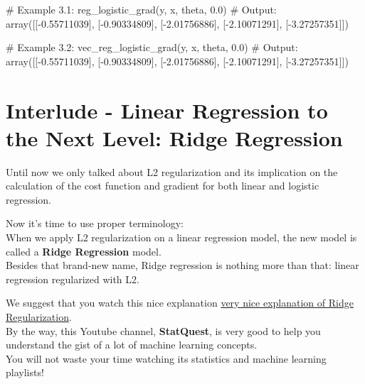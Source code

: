\documentclass[]{article}
\newenvironment{Shaded}{\begin{snugshade}}{\end{snugshade}}
\newcommand{\CommentTok}[1]{\textcolor[rgb]{0.48,0.49,0.49}{#1}}
\newcommand{\FloatTok}[1]{\textcolor[rgb]{0.96,0.45,0.00}{#1}}
\newcommand{\NormalTok}[1]{\textcolor[rgb]{0.81,0.81,0.76}{#1}}
\newcommand{\OperatorTok}[1]{\textcolor[rgb]{0.81,0.81,0.76}{#1}}
\begin{document}
\begin{Shaded}
\begin{Highlighting}[]
\CommentTok{# Example 3.1:}
\NormalTok{reg_logistic_grad(y, x, theta, }\FloatTok{0.0}\NormalTok{)}
\CommentTok{# Output:}
\NormalTok{array([[}\OperatorTok{-}\FloatTok{0.55711039}\NormalTok{],}
\NormalTok{       [}\OperatorTok{-}\FloatTok{0.90334809}\NormalTok{],}
\NormalTok{       [}\OperatorTok{-}\FloatTok{2.01756886}\NormalTok{],}
\NormalTok{       [}\OperatorTok{-}\FloatTok{2.10071291}\NormalTok{],}
\NormalTok{       [}\OperatorTok{-}\FloatTok{3.27257351}\NormalTok{]])}

\CommentTok{# Example 3.2:}
\NormalTok{vec_reg_logistic_grad(y, x, theta, }\FloatTok{0.0}\NormalTok{)}
\CommentTok{# Output:}
\NormalTok{array([[}\OperatorTok{-}\FloatTok{0.55711039}\NormalTok{],}
\NormalTok{       [}\OperatorTok{-}\FloatTok{0.90334809}\NormalTok{],}
\NormalTok{       [}\OperatorTok{-}\FloatTok{2.01756886}\NormalTok{],}
\NormalTok{       [}\OperatorTok{-}\FloatTok{2.10071291}\NormalTok{],}
\NormalTok{       [}\OperatorTok{-}\FloatTok{3.27257351}\NormalTok{]])}
\end{Highlighting}
\end{Shaded}

\clearpage

\hypertarget{interlude---linear-regression-to-the-next-level-ridge-regression-1}{%
\section{Interlude - Linear Regression to the Next Level: Ridge
Regression}\label{interlude---linear-regression-to-the-next-level-ridge-regression-1}}

Until now we only talked about L2 regularization and its implication on
the calculation of the cost function and gradient for both linear and
logistic regression.

Now it's time to use proper terminology:\\
When we apply L2 regularization on a linear regression model, the new
model is called a \textbf{Ridge Regression} model.\\
Besides that brand-new name, Ridge regression is nothing more than that:
linear regression regularized with L2.

We suggest that you watch this nice explanation
\href{https://www.youtube.com/watch?v=Q81RR3yKn30}{very nice explanation
of Ridge Regularization}.\\
By the way, this Youtube channel, \textbf{StatQuest}, is very good to
help you understand the gist of a lot of machine learning concepts.\\
You will not waste your time watching its statistics and machine
learning playlists! \clearpage
\end{document}

